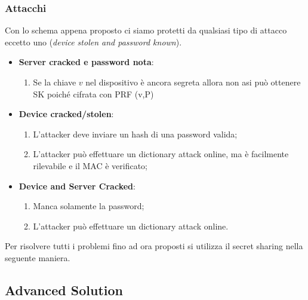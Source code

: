 \documentclass{book}
\begin{document}
\subsubsection{Attacchi}
Con lo schema appena proposto ci siamo protetti da qualsiasi tipo di attacco eccetto uno (\emph{device stolen and password known}).\begin{itemize}
	\item \textbf{Server cracked e password nota}:\begin{enumerate}
		      \item Se la chiave \(v\) nel dispositivo è ancora segreta allora non asi può ottenere SK poiché cifrata con PRF (v,P)
	      \end{enumerate}
	\item \textbf{Device cracked/stolen}:\begin{enumerate}
		      \item L'attacker deve inviare un hash di una password valida;
		      \item L'attacker può effettuare un dictionary attack online, ma è facilmente rilevabile e il MAC è verificato;
	      \end{enumerate}
	\item \textbf{Device and Server Cracked}:\begin{enumerate}
		      \item Manca solamente la password;
		      \item L'attacker può effettuare un dictionary attack online.
	      \end{enumerate}
\end{itemize}
Per risolvere tutti i problemi fino ad ora proposti si utilizza il secret sharing nella seguente maniera.
\newpage
\subsection{Advanced Solution}
\end{document}
